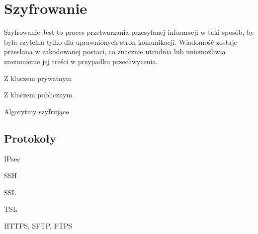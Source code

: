 \section{Szyfrowanie}

\begin{frame}
	\begin{alertblock}{Szyfrowanie}
		Jest to proces przetwarzania przesyłanej informacji w taki sposób, by była czytelna tylko dla uprawnionych stron komunikacji. Wiadomość zostaje przesłana w zakodowanej postaci, co znacznie utrudnia lub uniemożliwia zrozumienie jej treści w przypadku przechwycenia.
	\end{alertblock}
\end{frame}

\begin{frame}{Z kluczem prywatnym}

\end{frame}

\begin{frame}{Z kluczem publicznym}
	
\end{frame}

\begin{frame}{Algorytmy szyfrujące}
	
\end{frame}

\subsection{Protokoły}

\begin{frame}{IPsec}
	
\end{frame}

\begin{frame}{SSH}
	
\end{frame}

\begin{frame}{SSL}
	
\end{frame}

\begin{frame}{TSL}
	
\end{frame}

\begin{frame}{HTTPS, SFTP, FTPS}
	
\end{frame}

